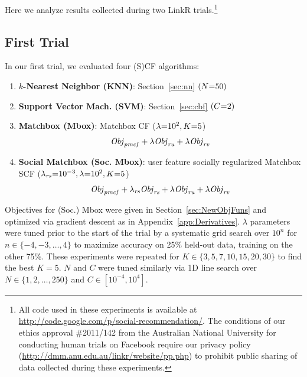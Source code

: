
Here we analyze results collected during two LinkR 
trials.\footnote{All code used in these experiments is available at
\url{http://code.google.com/p/social-recommendation/}.  The conditions
of our ethics approval \#2011/142 from the Australian National
University for conducting human trials on Facebook require our
privacy policy
(\url{http://dmm.anu.edu.au/linkr/website/pp.php}) to
prohibit public sharing of data collected during these experiments.}

\subsection{First Trial}

In our first trial, we evaluated four (S)CF algorithms:
\denselist
\begin{enumerate}
\item {\bf $k$-Nearest Neighbor (KNN)}: Section~\ref{sec:nn} $(N\hspace{-.9mm}=\hspace{-.9mm}50)$
\item {\bf Support Vector Mach. \sq(SVM)}: Section~\ref{sec:cbf} $(C\hspace{-.9mm}=\hspace{-.9mm}2)$
\item {\bf Matchbox (Mbox)}: Matchbox CF ($\lambda\hspace{-.9mm}=\hspace{-.9mm}10^2, K\hspace{-.9mm}=\hspace{-.9mm}5$) %
$$\mathit{Obj}_{\mathit{pmcf}} + \lambda \mathit{Obj}_{\mathit{ru}} + \lambda \mathit{Obj}_{\mathit{rv}}$$
\item {\bf Social Matchbox (Soc. \sqt Mbox)}: \sq
user feature socially regularized Matchbox SCF 
($\lambda_{\mathit{rs}}\hspace{-.9mm}=\hspace{-.9mm}10^{-3}, \lambda\hspace{-.9mm}=\hspace{-.9mm}10^2, K\hspace{-.9mm}=\hspace{-.9mm}5$)
$$\mathit{Obj}_{\mathit{pmcf}} + \lambda_{\mathit{rs}} \mathit{Obj}_{\mathit{rs}} + \lambda \mathit{Obj}_{\mathit{ru}} + \lambda \mathit{Obj}_{\mathit{rv}}$$
\end{enumerate}
Objectives for (Soc.) Mbox were given in Section~\ref{sec:NewObjFuns}
and optimized via gradient descent as in
Appendix~\ref{app:Derivatives}. $\lambda$ parameters were tuned prior
to the start of the trial by a systematic grid search over $10^n$ for
$n \in \{ -4,-3,\ldots,4 \}$ to maximize accuracy on 25\% held-out
data, training on the other 75\%.  These experiments were repeated for
$K \in \{ 3,5,7,10,15,20,30 \}$ to find the best $K=5$.  $N$ and $C$ were
tuned similarly via 1D line search over $N \in \{ 1,2,\ldots,250 \}$ and $C
\in [10^{-4},10^4]$.

